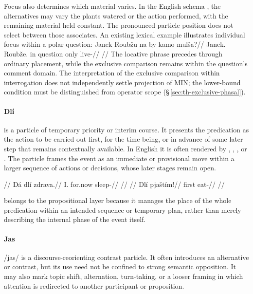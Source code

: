 Focus also determines which material varies. In the English schema
, the alternatives may vary the
plants watered or the action performed, with the remaining material held
constant. The pronounced particle position does not select between those
associates. An existing lexical example illustrates individual focus within
a polar question:
\pex
\begingl
\gla Janek Roubžu na by kamo mulša?//
\glb Janek.\Dir{} Roubže.\Ind{} in question only live-\Cont{}//
\glft {}//
\endgl
\xe
The locative phrase precedes  through ordinary placement, while
the exclusive comparison remains within the question's comment domain.
The interpretation of the exclusive comparison within interrogation does
not independently settle projection of MIN; the lower-bound condition must
be distinguished from operator scope
(§\,\ref{sec:th-exclusive-phasal}).

\paragraph{Dlí}  is a particle of temporary priority or interim
course. It presents the predication as the action to be carried out first, for
the time being, or in advance of some later step that remains contextually
available. In English it is often rendered by , ,
, or . The particle frames the event as an immediate or provisional move within a
larger sequence of actions or decisions, whose later stages remain open.

\pex
\a
\begingl
\glpreamble {}//
\gla Dá dlí zdrava.//
\glb I.\Dir{} for.now sleep-\Cont{}//
\glft {}//
\endgl
\a
\begingl
\glpreamble {}//
\gla Dlí pjaštím!//
\glb first eat-\Imp{}//
\glft {}//
\endgl
\xe

 belongs to the propositional layer because
it manages the place of the whole predication within an intended sequence or
temporary plan, rather than merely describing the internal phase of the event
itself.

\paragraph{Jas}  /jas/ is a discourse-reorienting contrast particle. It
often introduces an alternative or contrast, but its use need not be confined
to strong semantic opposition. It may also mark topic shift, alternation,
turn-taking, or a looser  framing in which attention is
redirected to another participant or proposition.

